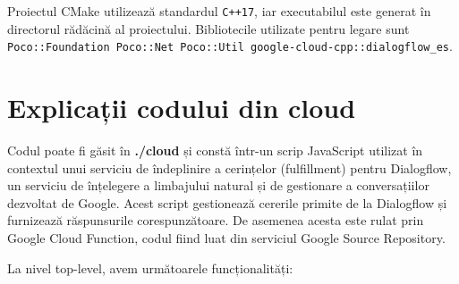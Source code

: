 Proiectul CMake utilizează standardul \texttt{C++17}, iar executabilul este generat în directorul rădăcină al proiectului. Bibliotecile utilizate pentru legare sunt \texttt{Poco::Foundation Poco::Net Poco::Util google-cloud-cpp::dialogflow\_es}.

\chapter{Explicații codului din cloud}

Codul poate fi găsit în \textbf{./cloud} și constă într-un scrip JavaScript utilizat în contextul unui serviciu de îndeplinire a cerințelor (fulfillment) pentru Dialogflow, un serviciu de înțelegere a limbajului natural și de gestionare a conversațiilor dezvoltat de Google. Acest script gestionează cererile primite de la Dialogflow și furnizează răspunsurile corespunzătoare. De asemenea acesta este rulat prin Google Cloud Function, codul fiind luat din serviciul Google Source Repository.

La nivel top-level, avem următoarele funcționalități:

